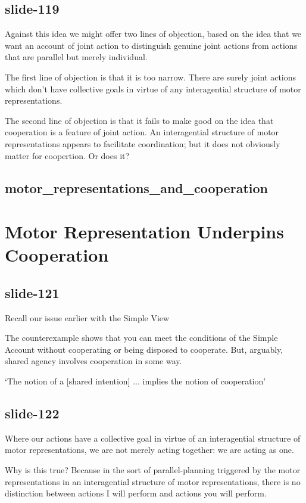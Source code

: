 \documentclass[12pt,\papersize]{extarticle}
\begin{document}
\subsection{slide-119}
Against this idea we might offer two lines of objection, based on the idea
that we want an account of joint action to distinguish genuine joint actions
from actions that are parallel but merely individual.

The first line of objection is that it is too narrow.
There are surely joint actions which don't have collective goals
in virtue of any interagential structure of motor representations.

The second line of objection is that it fails to make good on the idea
that cooperation is a feature of joint action.
An interagential structure
of motor representations appears to facilitate coordination; but
it does not obviously matter for coopertion.  Or does it?

\subsection{motor\_representations\_and\_cooperation}


\section{Motor Representation Underpins Cooperation}

\subsection{slide-121}
Recall our issue earlier with the Simple View

The counterexample shows that you can meet the conditions of the Simple
Account without cooperating or being disposed to cooperate.
But, arguably, shared agency involves cooperation in some way.

‘The notion of a [shared intention] ... implies the notion of cooperation’

\citep[p.~95]{Searle:1990em}

\subsection{slide-122}
Where our actions have a collective goal in virtue of an interagential structure
of motor representations, we are not merely acting together: we are acting as one.

Why is this true?
Because in the sort of parallel-planning triggered by the motor representations in
an interagential structure of motor representations, there is no distinction
between actions I will perform and actions you will perform.
\end{document}
